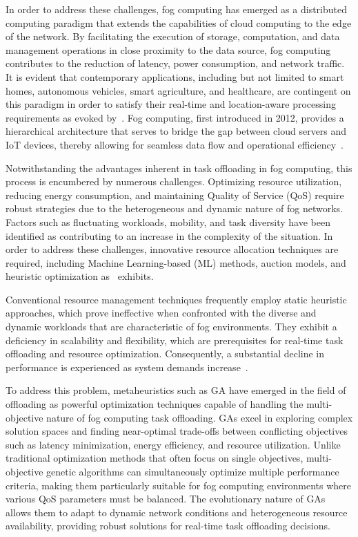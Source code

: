\documentclass[preprint,3p,authoryear]{elsarticle}
\begin{document}
In order to address these challenges, fog computing has emerged as a distributed computing paradigm that extends the capabilities of cloud computing to the edge of the network. By facilitating the execution of storage, computation, and data management operations in close proximity to the data source, fog computing contributes to the reduction of latency, power consumption, and network traffic. It is evident that contemporary applications, including but not limited to smart homes, autonomous vehicles, smart agriculture, and healthcare, are contingent on this paradigm in order to satisfy their real-time and location-aware processing requirements as evoked by~\cite{das_review_2023}. Fog computing, first introduced in 2012, provides a hierarchical architecture that serves to bridge the gap between cloud servers and IoT devices, thereby allowing for seamless data flow and operational efficiency~\citep{fahimullah_review_2022}.

Notwithstanding the advantages inherent in task offloading in fog computing, this process is encumbered by numerous challenges. Optimizing resource utilization, reducing energy consumption, and maintaining Quality of Service (QoS) require robust strategies due to the heterogeneous and dynamic nature of fog networks. Factors such as fluctuating workloads, mobility, and task diversity have been identified as contributing to an increase in the complexity of the situation. In order to address these challenges, innovative resource allocation techniques are required, including Machine Learning-based (ML) methods, auction models, and heuristic optimization as~\cite{fahimullah_review_2022} exhibits.

Conventional resource management techniques frequently employ static heuristic approaches, which prove ineffective when confronted with the diverse and dynamic workloads that are characteristic of fog environments. They exhibit a deficiency in scalability and flexibility, which are prerequisites for real-time task offloading and resource optimization. Consequently, a substantial decline in performance is experienced as system demands increase~\citep{iftikhar_ai-based_2023}.

To address this problem, metaheuristics such as GA have emerged in the field of offloading as powerful optimization techniques capable of handling the multi-objective nature of fog computing task offloading. GAs excel in exploring complex solution spaces and finding near-optimal trade-offs between conflicting objectives such as latency minimization, energy efficiency, and resource utilization. Unlike traditional optimization methods that often focus on single objectives, multi-objective genetic algorithms can simultaneously optimize multiple performance criteria, making them particularly suitable for fog computing environments where various QoS parameters must be balanced. The evolutionary nature of GAs allows them to adapt to dynamic network conditions and heterogeneous resource availability, providing robust solutions for real-time task offloading decisions.
\end{document}
